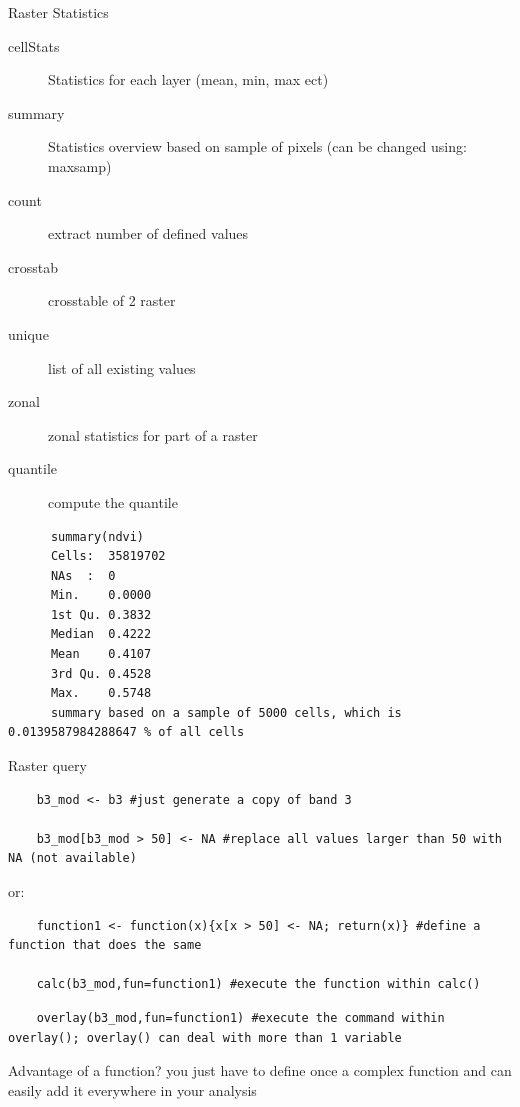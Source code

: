 \begin{frame}[fragile]{Raster Statistics}
      \begin{description}
	  \item[cellStats] Statistics for each layer (mean, min, max ect) 
	  \item[summary] Statistics overview based on sample of pixels (can be changed using: maxsamp)
	  \item[count] extract number of defined values
	  \item[crosstab] crosstable of 2 raster
	  \item[unique] list of all existing values
	  \item[zonal] zonal statistics for part of a raster
	  \item[quantile] compute the quantile
	\end{description}
  

    \begin{lstlisting}
	  summary(ndvi)
	  Cells:  35819702 
	  NAs  :  0 
	  Min.    0.0000
	  1st Qu. 0.3832
	  Median  0.4222
	  Mean    0.4107
	  3rd Qu. 0.4528
	  Max.    0.5748
	  summary based on a sample of 5000 cells, which is 0.0139587984288647 % of all cells 
   \end{lstlisting}

\end{frame}


\begin{frame}[fragile]{Raster query}

    \begin{lstlisting}
	b3_mod <- b3 #just generate a copy of band 3
	
	b3_mod[b3_mod > 50] <- NA #replace all values larger than 50 with NA (not available)
    \end{lstlisting}
    
    \bigskip \pause or:

    
        \begin{lstlisting}
	function1 <- function(x){x[x > 50] <- NA; return(x)} #define a function that does the same
	
	calc(b3_mod,fun=function1) #execute the function within calc()
	\end{lstlisting}

	\begin{lstlisting}
	overlay(b3_mod,fun=function1) #execute the command within overlay(); overlay() can deal with more than 1 variable
	\end{lstlisting}
	
	
	\bigskip \pause Advantage of a function? \pause you just have to define once a complex function and can easily add it everywhere in your analysis
	
\end{frame}


